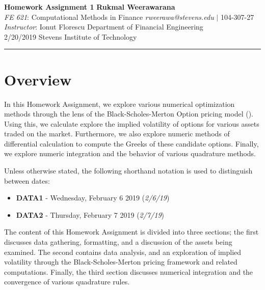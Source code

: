 \documentclass[10pt]{article}
\begin{document}
\thispagestyle{plain}


\noindent
\large\textbf{Homework Assignment 1} \hfill \textbf{Rukmal Weerawarana} \\
\normalsize \textit{FE 621}: Computational Methods in Finance \hfill \textit{rweerawa@stevens.edu} $\mid$ 104-307-27 \\
\textit{Instructor}: Ionut Florescu \hfill Department of Financial Engineering \\
2/20/2019 \hfill Stevens Institute of Technology

\noindent\rule{\linewidth}{.1em}



\section*{Overview}

In this Homework Assignment, we explore various numerical optimization methods through the lens of the Black-Scholes-Merton Option pricing model (\cite{Shreve2004}). Using this, we calculate explore the implied volatility of options for various assets traded on the market. Furthermore, we also explore numeric methods of differential calculation to compute the Greeks of these candidate options. Finally, we explore numeric integration and the behavior of various quadrature methods.

Unless otherwise stated, the following shorthand notation is used to distinguish between dates:

\begin{itemize}
    \item \textbf{DATA1} - Wednesday, February 6 2019 (\textit{2/6/19})
    \item \textbf{DATA2} - Thursday, February 7 2019 (\textit{2/7/19})
\end{itemize}

The content of this Homework Assignment is divided into three sections; the first discusses data gathering, formatting, and a discussion of the assets being examined. The second contains data analysis, and an exploration of implied volatility through the Black-Scholes-Merton pricing framework and related computations. Finally, the third section discusses numerical integration and the convergence of various quadrature rules.
\end{document}

